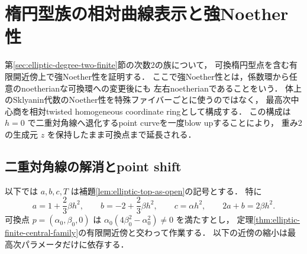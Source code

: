 \section{楕円型族の相対曲線表示と強Noether性}
\label{sec:elliptic-relative}

第\ref{sec:elliptic-degree-two-finite}節の次数2の族について，
可換楕円型点を含む有限開近傍上で強Noether性を証明する．
ここで強Noether性とは，係数環から任意のnoetherianな可換環への変更後にも
左右noetherianであることをいう．
体上のSklyanin代数のNoether性を特殊ファイバーごとに使うのではなく，
最高次中心商を相対twisted homogeneous coordinate ringとして構成する．
この構成は $h=0$ で二重対角線へ退化するpoint curveを一度blow upすることにより，
重み2の生成元 $z$ を保持したまま可換点まで延長される．

\subsection{二重対角線の解消とpoint shift}

以下では $a,b,c,T$ は補題\ref{lem:elliptic-top-as-open}の記号とする．
特に
\[
 a=1+\frac23\beta h^2,\qquad
 b=-2+\frac23\beta h^2,\qquad c=\alpha h^2,
 \qquad 2a+b=2\beta h^2.
\]
可換点 $p=(\alpha_0,\beta_0,0)$ は
$\alpha_0(4\beta_0^2-\alpha_0^2)\ne0$ を満たすとし，
定理\ref{thm:elliptic-finite-central-family}の有限開近傍と交わって作業する．
以下の近傍の縮小は最高次パラメータだけに依存する．

